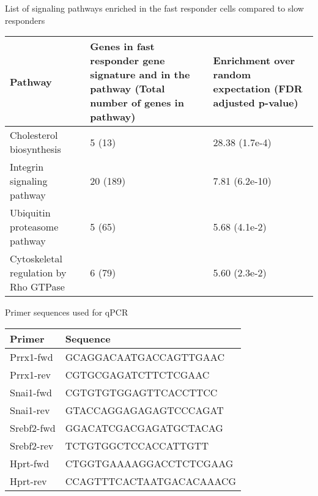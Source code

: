 \begin{supptable}[htb]
\centering
\caption{List of signaling pathways enriched in the fast responder cells compared to slow responders}
\begin{tabular}{lp{13cm}}
\toprule
\textbf{Pathway} & \textbf{Genes in fast responder gene signature and in the pathway (Total number of genes in pathway)} & \textbf{Enrichment over random expectation (FDR adjusted p-value)} \\
\midrule
Cholesterol biosynthesis & 5 (13) & 28.38 (1.7e-4) \\
Integrin signaling pathway & 20 (189) & 7.81 (6.2e-10) \\
Ubiquitin proteasome pathway & 5 (65) & 5.68 (4.1e-2) \\
Cytoskeletal regulation by Rho GTPase & 6 (79) & 5.60 (2.3e-2) \\
\bottomrule
\end{tabular}
\label{tab:hedgehog_tableS2}
\end{supptable}


\begin{supptable}[htb]
\centering
\caption{Primer sequences used for qPCR}
\begin{tabular}{lp{13cm}}
\toprule
\textbf{Primer} & \textbf{Sequence} \\
\midrule
Prrx1-fwd & GCAGGACAATGACCAGTTGAAC \\
Prrx1-rev & CGTGCGAGATCTTCTCGAAC \\
Snai1-fwd & CGTGTGTGGAGTTCACCTTCC \\
Snai1-rev & GTACCAGGAGAGAGTCCCAGAT \\
Srebf2-fwd & GGACATCGACGAGATGCTACAG \\
Srebf2-rev & TCTGTGGCTCCACCATTGTT \\
Hprt-fwd & CTGGTGAAAAGGACCTCTCGAAG \\
Hprt-rev & CCAGTTTCACTAATGACACAAACG \\
\bottomrule
\end{tabular}
\label{tab:hedgehog_tableS3}
\end{supptable}